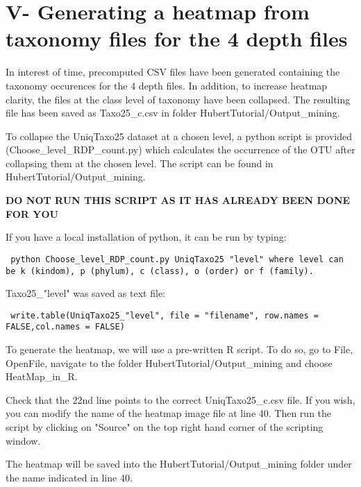 \documentclass[a4paper,12pt,twoside]{memoir}
\begin{document}
\section{V- Generating a heatmap from taxonomy files for the 4 depth files}

\begin{information}
In interest of time, precomputed CSV files have been generated containing the taxonomy occurences for the 4 depth files.
In addition, to increase heatmap clarity, the files at the class level of taxonomy have been collapsed. The resulting file has been saved as Taxo25\_c.csv in folder HubertTutorial/Output\_mining.
\end{information}

\begin{warning}
To collapse the UniqTaxo25 dataset at a chosen level, a python script is provided (Choose\_level\_RDP\_count.py) which calculates the occurrence of the OTU after collapsing them at the chosen level. 
The script can be found in HubertTutorial/Output\_mining.

\textbf{DO NOT RUN THIS SCRIPT AS IT HAS ALREADY BEEN DONE FOR YOU}

If you have a local installation of python, it can be run by typing:
\begin{lstlisting}
 python Choose_level_RDP_count.py UniqTaxo25 "level" where level can be k (kindom), p (phylum), c (class), o (order) or f (family). 
\end{lstlisting}
Taxo25\_"level" was saved as text file:
\begin{lstlisting}
 write.table(UniqTaxo25_"level", file = "filename", row.names = FALSE,col.names = FALSE)
\end{lstlisting}
\end{warning}

\begin{steps}
To generate the heatmap, we will use a pre-written R script. To do so, go to File, OpenFile, navigate to the folder HubertTutorial/Output\_mining and choose HeatMap\_in\_R.

Check that the 22nd line points to the correct UniqTaxo25\_c.csv file. If you wish, you can modify the name of the heatmap image file at line 40.
Then run the script by clicking on "Source" on the top right hand corner of the scripting window.

The heatmap will be saved into the HubertTutorial/Output\_mining folder under the name indicated in line 40.
\end{steps}
\end{document}
